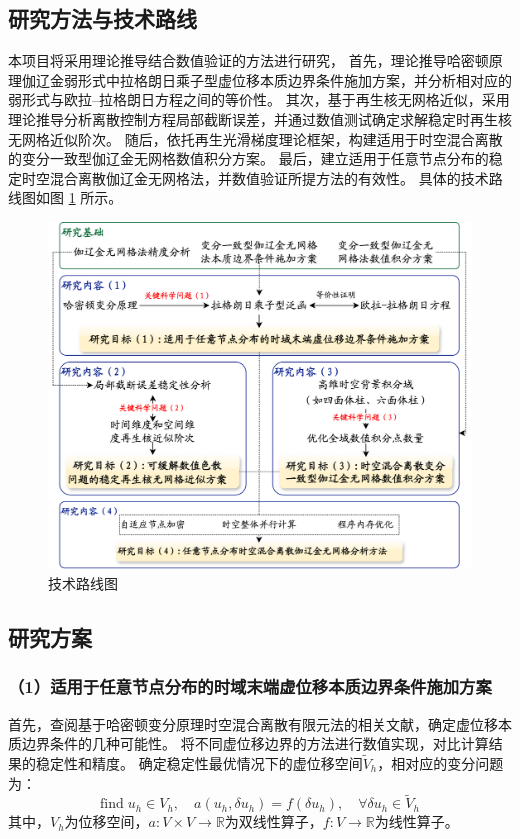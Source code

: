 \setlength{\abovedisplayskip}{0pt}
\setlength{\belowdisplayskip}{0pt}

\subsection{研究方法与技术路线}

本项目将采用理论推导结合数值验证的方法进行研究，
首先，理论推导哈密顿原理伽辽金弱形式中拉格朗日乘子型虚位移本质边界条件施加方案，并分析相对应的弱形式与欧拉--拉格朗日方程之间的等价性。
其次，基于再生核无网格近似，采用理论推导分析离散控制方程局部截断误差，并通过数值测试确定求解稳定时再生核无网格近似阶次。
随后，依托再生光滑梯度理论框架，构建适用于时空混合离散的变分一致型伽辽金无网格数值积分方案。
最后，建立适用于任意节点分布的稳定时空混合离散伽辽金无网格法，并数值验证所提方法的有效性。
具体的技术路线图如图 \ref{fg:roadmap} 所示。

\begin{figure}[!h]
    \centering 
    \includegraphics[width=\textwidth]{figures/roadmap.png}
    \caption{技术路线图}
    \label{fg:roadmap}
\end{figure}

\subsection{研究方案}

\subsubsection*{\bfseries （1）适用于任意节点分布的时域末端虚位移本质边界条件施加方案}
首先，查阅基于哈密顿变分原理时空混合离散有限元法的相关文献，确定虚位移本质边界条件的几种可能性。
将不同虚位移边界的方法进行数值实现，对比计算结果的稳定性和精度。
确定稳定性最优情况下的虚位移空间$\tilde V_h$，相对应的变分问题为：
\begin{equation}
    \text{find} \; u_h \in V_h, \quad a(u_h, \delta u_h) = f(\delta u_h), \quad \forall \delta u_h \in \tilde V_h
    \label{eq:1}
\end{equation}
其中，$V_h$为位移空间，$a:V\times V \rightarrow \mathbb R$为双线性算子，$f:V\rightarrow \mathbb R$为线性算子。

